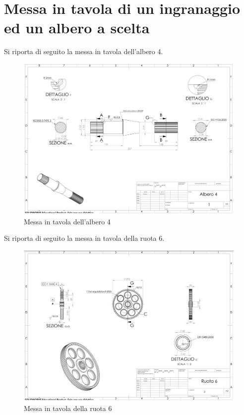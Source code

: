 \section{Messa in tavola di un ingranaggio ed un albero a scelta}
Si riporta di seguito la messa in tavola dell'albero 4. 
\begin{figure}[h]
    \centering
    \includegraphics[scale=0.51, angle=90]{Immagini/TavolaAlbero4.png}
    \caption{Messa in tavola dell'albero 4}
    \label{fig:TavolaAlbero4}
\end{figure}
\newpage
Si riporta di seguito la messa in tavola della ruota 6.
\begin{figure}[h]
    \centering
    \includegraphics[scale=0.43, angle=90]{Immagini/TavolaRuota6.png}
    \caption{Messa in tavola della ruota 6}
    \label{fig:TavolaRuota6}
\end{figure}